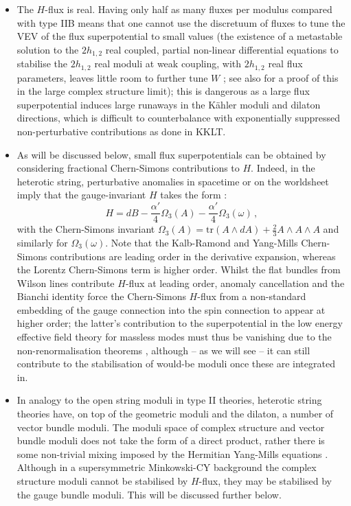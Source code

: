\begin{itemize}
\item The $H$-flux is real.  Having only half as many fluxes per modulus compared with type IIB means that one cannot use the discretuum of fluxes to tune the VEV of the flux superpotential to small values \cite{Curio:2005ew} (the existence of a metastable solution to the $2h_{1,2}$ real coupled, partial non-linear differential equations to stabilise the $2h_{1,2}$ real moduli at weak coupling, with $2h_{1,2}$ real flux parameters, leaves little room to further tune $W$ \cite{Cicoli:2014sva}; see also \cite{Anderson:2011cza} for a proof of this in the large complex structure limit); this is dangerous as a large flux superpotential induces large runaways in the K\"ahler moduli and dilaton directions, which is difficult to counterbalance with exponentially suppressed non-perturbative contributions as done in KKLT.  
\item As will be discussed below, small flux superpotentials can be obtained by considering fractional Chern-Simons contributions to $H$.  Indeed, in the heterotic string, perturbative anomalies in spacetime or on the worldsheet imply that the gauge-invariant $H$ takes the form \cite{Rohm:1985jv}:
\begin{equation}
H = dB -\frac{\alpha'}{4}\Omega_3(A)-\frac{\alpha'}{4}\Omega_3(\omega)\,, \label{E:HwithCS}
\end{equation}
with the Chern-Simons invariant $\Omega_3(A)= \textrm{tr}(A\wedge dA)+\frac23 A \wedge A \wedge A$ and similarly for $\Omega_3(\omega)$.  Note that the Kalb-Ramond and Yang-Mills Chern-Simons contributions are leading order in the derivative expansion, whereas the Lorentz Chern-Simons term is higher order.  Whilst the flat bundles from Wilson lines contribute $H$-flux at leading order, anomaly cancellation and the Bianchi identity force the Chern-Simons $H$-flux from a non-standard embedding of the gauge connection into the spin connection to appear at higher order; the latter's contribution to the superpotential in the low energy effective field theory for massless modes must thus be vanishing due to the non-renormalisation theorems \cite{Dine:1986vd}, although -- as we will see -- it can still contribute to the stabilisation of would-be moduli once these are integrated in.
\item In analogy to the open string moduli in type II theories, heterotic string theories have, on top of the geometric moduli and the dilaton, a number of vector bundle moduli.  The moduli space of complex structure and vector bundle moduli does not take the form of a direct product, rather there is some non-trivial mixing imposed by the Hermitian Yang-Mills equations \cite{Witten:1985bz, Anderson:2010mh, Anderson:2011cza, Anderson:2011ty}.  Although in a supersymmetric Minkowski-CY background the complex structure moduli cannot be stabilised by $H$-flux, they may be stabilised by the gauge bundle moduli. This will be discussed further below.
\end{itemize}


